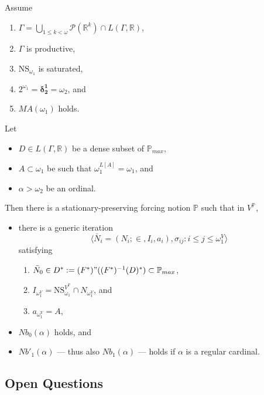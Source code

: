 \documentclass[12pt]{article}
\numberwithin{equation}{section}
\begin{document}
\begin{cor}\label{nbcoro2}
Assume
\begin{enumerate}[label=(\roman*), leftmargin=40pt]
    \item $\Gamma  = \bigcup_{1 \leq k < \omega} \mathcal{P}(\mathbb{R}^{k}) \cap L(\Gamma, \mathbb{R})$,
    \item $\Gamma$ is productive,
    \item $\mathrm{NS}_{\omega_1}$ is saturated,
    \item $2^{\omega_1} = \mathbf{\delta^1_2} = \omega_2$, and
    \item $MA(\omega_1)$ holds.
\end{enumerate}
Let 
\begin{itemize}
    \item $D \in L(\Gamma, \mathbb{R})$ be a dense subset of $\mathbb{P}_{max}$,
    \item $A \subset \omega_1$ be such that $\omega_1^{L[A]} = \omega_1$, and
    \item $\alpha > \omega_2$ be an ordinal.
\end{itemize}
Then there is a stationary-preserving forcing notion $\mathbb{P}$ such that in $V^{\mathbb{P}}$,
\begin{itemize}
    \item there is a generic iteration $$\langle \bar{N}_i = (N_i; \in, I_i, a_i), \sigma_{ij} : i \leq j \leq \omega_1^V \rangle$$ satisfying 
    \begin{enumerate}[label=(\arabic*), leftmargin=40pt]
        \item $\bar{N}_0 \in D^* := (F^*) " ((F^*)^{-1}(D)^*) \subset \mathbb{P}_{max}$,
        \item $I_{\omega_1^V} = \mathrm{NS}_{\omega_1}^{V^{\mathbb{P}}} \cap N_{\omega_1^V}$, and
        \item $a_{\omega_1^V} = A$, 
    \end{enumerate}
    \item $Nb_0(\alpha)$ holds, and
    \item $Nb'_1(\alpha)$ --- thus also $Nb_1(\alpha)$ --- holds if $\alpha$ is a regular cardinal.
\end{itemize}
\end{cor}

\subsection{Open Questions}
\end{document}
